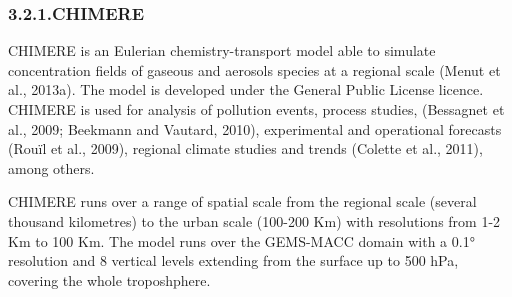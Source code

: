 \documentclass[9pt]{report}
\begin{document}
\subsubsection{3.2.1.\hspace*{0.5em}CHIMERE}\label{sec-chimere}%

\noindent{}CHIMERE is an Eulerian chemistry-transport model able to simulate concentration ﬁelds of gaseous and aerosols species at a regional scale (Menut et al., 2013a). 
The model is developed under the General Public License licence. CHIMERE is used for analysis of pollution events, process studies, (Bessagnet et al., 2009; Beekmann and Vautard, 2010), experimental and operational forecasts (Rouïl et al., 2009), regional climate studies and trends (Colette et al., 2011), among others.%

CHIMERE runs over a range of spatial scale from the regional scale (several thousand kilometres) to the urban scale (100-200 Km) with resolutions from 1-2 Km to 100 Km. 
The model runs over the GEMS-MACC domain with a 0.1° resolution and 8 vertical levels extending from the surface up to 500 hPa, covering the whole troposhphere.%
\end{document}
